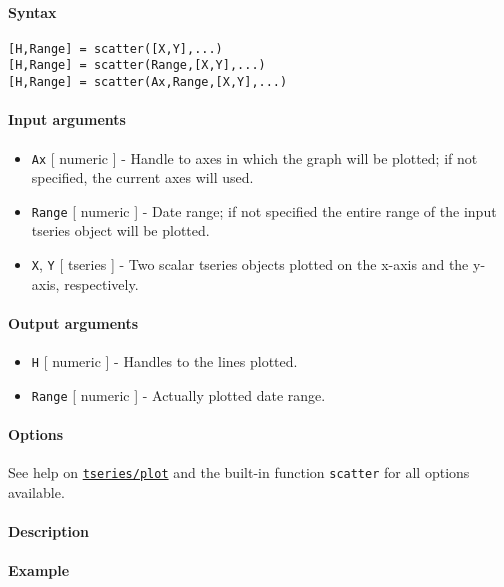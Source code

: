 


	\paragraph{Syntax}

\begin{verbatim}
[H,Range] = scatter([X,Y],...)
[H,Range] = scatter(Range,[X,Y],...)
[H,Range] = scatter(Ax,Range,[X,Y],...)
\end{verbatim}

\paragraph{Input arguments}

\begin{itemize}
\item
  \texttt{Ax} {[} numeric {]} - Handle to axes in which the graph will
  be plotted; if not specified, the current axes will used.
\item
  \texttt{Range} {[} numeric {]} - Date range; if not specified the
  entire range of the input tseries object will be plotted.
\item
  \texttt{X}, \texttt{Y} {[} tseries {]} - Two scalar tseries objects
  plotted on the x-axis and the y-axis, respectively.
\end{itemize}

\paragraph{Output arguments}

\begin{itemize}
\item
  \texttt{H} {[} numeric {]} - Handles to the lines plotted.
\item
  \texttt{Range} {[} numeric {]} - Actually plotted date range.
\end{itemize}

\paragraph{Options}

See help on \href{tseries/plot}{\texttt{tseries/plot}} and the built-in
function \texttt{scatter} for all options available.

\paragraph{Description}

\paragraph{Example}



